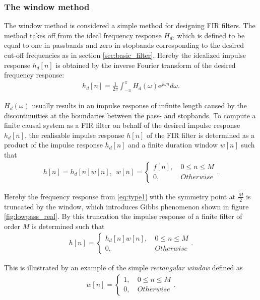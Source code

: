 \subsubsection{The window method}
The window method is considered a simple method for designing FIR filters. The method takes off from the ideal frequency response $H_d$, which is defined to be equal to one in passbands and zero in stopbands corresponding to the desired cut-off frequencies as in section \ref{sec:basic_filter}. Hereby the idealized impulse response $h_d[n]$ is obtained by the inverse Fourier transform of the desired frequency response:
\begin{align*}
h_d[n]=\frac{1}{2\pi}\int_{-\pi}^{\pi} H_d(\omega)\text{e}^{j\omega n} d\omega.
\end{align*}

$H_d(\omega)$ usually results in an impulse response of infinite length caused by the discontinuities at the boundaries between the pass- and stopbands. To compute a finite causal system as a FIR filter on behalf of the desired impulse response $h_d[n]$, the realisable impulse response $h[n]$ of the FIR filter is determined as a product of the impulse response $h_d[n]$ and a finite duration window $w[n]$ such that
\begin{align*}
h[n]=h_d[n]w[n], \ \ w[n] =
\begin{cases}
f[n], &\ 0 \leq n \leq M \\
0, &\ Otherwise
\end{cases}.
\end{align*}

Hereby the frequency response from \eqref{eq:type1} with the symmetry point at $\frac{M}{2}$ is truncated by the window, which introduces Gibbs phenomenon shown in figure \ref{fig:lowpass_real}. By this truncation the impulse response of a finite filter of order $M$ is determined such that
\begin{align*}
h[n]= 
\begin{cases}
h_d[n]w[n], &\ 0 \leq n \leq M \\
0, &\ Otherwise
\end{cases}.
\end{align*}

This is illustrated by an example of the simple \textit{rectangular window} defined as 
\begin{align*}
w[n] =
\begin{cases}
1, &\ 0 \leq n \leq M \\
0, &\ Otherwise
\end{cases}.
\end{align*}


